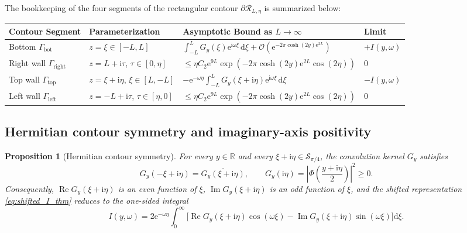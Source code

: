 \documentclass[11pt,a4paper,reqno]{amsart}
\newtheorem{proposition}[theorem]{Proposition}
\theoremstyle{definition}
\theoremstyle{remark}
\numberwithin{equation}{section}
\newcommand{\dd}{\mathrm{d}}
\newcommand{\ii}{\mathrm{i}}
\newcommand{\ee}{\mathrm{e}}
\newcommand{\Rea}{\operatorname{Re}}
\newcommand{\Ima}{\operatorname{Im}}
\begin{document}
The bookkeeping of the four segments of the rectangular contour $\partial\mathcal{R}_{L,\eta}$ is summarized below:

\begin{center}
\footnotesize
\begin{tabular}{llll}
\textbf{Contour Segment} & \textbf{Parameterization} & \textbf{Asymptotic Bound as $L \to \infty$} & \textbf{Limit} \\
\hline
Bottom $\Gamma_{\mathrm{bot}}$ & $z = \xi \in [-L, L]$ & $\int_{-L}^L G_y(\xi)\ee^{\ii\omega\xi}\,\dd\xi + \mathcal{O}(\ee^{-2\pi\cosh(2y)\ee^{2L}})$ & $+I(y,\omega)$ \\
Right wall $\Gamma_{\mathrm{right}}$ & $z = L + \ii\tau$, $\tau \in [0, \eta]$ & $\le \eta C_2 \ee^{9L}\exp(-2\pi\cosh(2y)\ee^{2L}\cos(2\eta))$ & $0$ \\
Top wall $\Gamma_{\mathrm{top}}$ & $z = \xi + \ii\eta$, $\xi \in [L, -L]$ & $-\ee^{-\omega\eta}\int_{-L}^L G_y(\xi+\ii\eta)\ee^{\ii\omega\xi}\,\dd\xi$ & $-I(y,\omega)$ \\
Left wall $\Gamma_{\mathrm{left}}$ & $z = -L + \ii\tau$, $\tau \in [\eta, 0]$ & $\le \eta C_2 \ee^{9L}\exp(-2\pi\cosh(2y)\ee^{2L}\cos(2\eta))$ & $0$ \\
\end{tabular}
\end{center}

\subsection{Hermitian contour symmetry and imaginary-axis positivity}\label{subsec:hermitian}

\begin{proposition}[Hermitian contour symmetry]\label{prop:hermitian}
For every $y \in \mathbb{R}$ and every $\xi + \ii\eta \in \mathcal{S}_{\pi/4}$, the convolution kernel $G_y$ satisfies
\begin{equation}\label{eq:hermitian_sym}
G_y(-\xi + \ii\eta) = \overline{G_y(\xi + \ii\eta)}, \qquad G_y(\ii\eta) = \left|\Phi\!\left(\frac{y+\ii\eta}{2}\right)\right|^2 \ge 0.
\end{equation}
Consequently, $\Rea G_y(\xi+\ii\eta)$ is an even function of $\xi$, $\Ima G_y(\xi+\ii\eta)$ is an odd function of $\xi$, and the shifted representation \eqref{eq:shifted_I_thm} reduces to the one-sided integral
\begin{equation}\label{eq:shifted_I_onesided}
I(y,\omega) = 2\ee^{-\omega\eta}\int_0^\infty \Big[\Rea G_y(\xi+\ii\eta)\cos(\omega\xi) - \Ima G_y(\xi+\ii\eta)\sin(\omega\xi)\Big]\dd\xi.
\end{equation}
\end{proposition}
\end{document}
